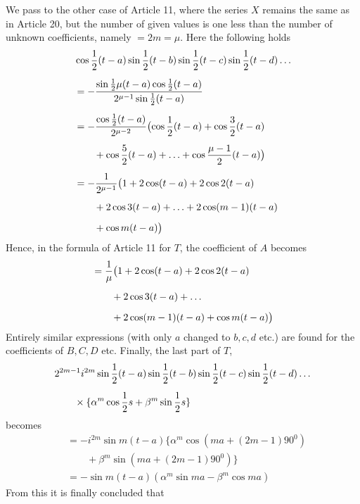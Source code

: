 \begingroup
\renewcommand{\arraystretch}{1.45}
We pass to the other case of Article 11, where the series \(X\) remains the same as in Article 20, but the number of given values is one less than
the number of unknown coefficients, namely \(=2m=\mu\). Here the following holds
\[
\begin{aligned}
&\cos\frac12(t-a)\sin\frac12(t-b)\sin\frac12(t-c)\sin\frac12(t-d)\mathinner{.\,.\,.}\\[5pt]
&=-\frac{\sin\frac12\mu(t-a)\cos\frac12(t-a)}{2^{\mu-1}\sin\frac12(t-a)}\\[5pt]
&=-\frac{\cos\frac12(t-a)}{2^{\mu-2}}\bigl(\cos\frac12(t-a)+\cos\frac32(t-a)\\[5pt]&\qquad{}+\cos\frac52(t-a)+\mathinner{.\,.\,.}+\cos\frac{\mu-1}{2}(t-a)\bigr)\\[5pt]
&=-\frac{1}{2^{\mu-1}}\bigl(1+2\cos(t-a)+2\cos2(t-a)\\[5pt]&\qquad{}+2\cos3(t-a)+\mathinner{.\,.\,.}+2\cos(m-1)(t-a)\\[5pt]
&\qquad +\cos m(t-a)\bigr)
\end{aligned}
\]
Hence, in the formula of Article 11 for $T$, the coefficient of $A$ becomes
\[
\begin{aligned}
&=\frac1\mu\bigl(1+2\cos(t-a)+2\cos2(t-a)\\[5pt]&\qquad{}+2\cos3(t-a)+\mathinner{.\,.\,.}\\[5pt]
&\qquad +2\cos(m-1)(t-a)+\cos m(t-a)\bigr)
\end{aligned}
\]
Entirely similar expressions (with only $a$ changed to $b,c,d$ etc.) are found for the coefficients of $B,C,D$ etc. Finally, the last part of $T$,
\[
\begin{aligned}
&2^{2m-1}i^{2m}\sin\frac12(t-a)\sin\frac12(t-b)\sin\frac12(t-c)\sin\frac12(t-d)\mathinner{.\,.\,.}\\[5pt]&\qquad\times\{\alpha^m\cos\frac12s+\beta^m\sin\frac12s\}
\end{aligned}
\]
becomes
\[
\begin{aligned}
&=-i^{2m}\sin m(t-a)\{\alpha^m\cos(ma+(2m-1)90^{0})\\[5pt]&\qquad{}+\beta^m\sin(ma+(2m-1)90^{0})\}\\[5pt]
&=-\sin m(t-a)(\alpha^m\sin ma-\beta^m\cos ma)
\end{aligned}
\]
From this it is finally concluded that
